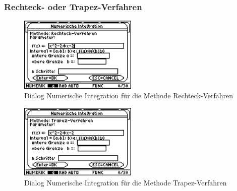 \documentclass[a4paper,10pt]{scrreprt}
\begin{document}
\subsubsection*{Rechteck- oder Trapez-Verfahren}
\begin{figure}[h]
  \centering
  \includegraphics[width=0.5\textwidth]{img/nummeth_image024.png}
  \caption{Dialog Numerische Integration f\"ur die Methode Rechteck-Verfahren}
  \label{fig:ParameterIntegrationRechteck}
\end{figure}
\begin{figure}[h]
  \centering
  \includegraphics[width=0.5\textwidth]{img/nummeth_image026.png}
  \caption{Dialog Numerische Integration f\"ur die Methode Trapez-Verfahren}
  \label{fig:ParameterIntegrationTrapez}
\end{figure}

\newpage
\end{document}
